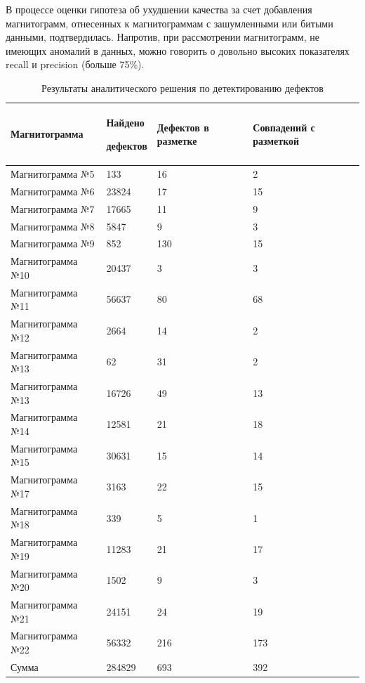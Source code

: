 \documentclass[a4paper,article,14pt]{extarticle}
\begin{document}
В процессе оценки гипотеза об ухудшении качества за счет добавления магнитограмм, отнесенных к магнитограммам 
с зашумленными или \flqq битыми\frqq\, данными, подтвердилась. Напротив, при рассмотрении магнитограмм, не имеющих аномалий 
в данных, можно говорить о довольно высоких показателях recall и precision (больше 75\%).

\begin{center}
    \begin{longtable}{|p{5cm}|p{3cm}|p{3cm}|p{3cm}|}
        \caption{Результаты аналитического решения по детектированию дефектов}\\\hline
        Магнитограмма & Найдено \par дефектов & Дефектов в разметке & Совпадений с разметкой \\ \hline
        Магнитограмма №5	& 133	& 16	& 2 \\ \hline
        Магнитограмма №6	& 23824	& 17	& 15 \\ \hline
        Магнитограмма №7	& 17665	& 11	& 9 \\ \hline
        Магнитограмма №8	& 5847	& 9	    & 3 \\ \hline
        Магнитограмма №9	& 852	& 130	& 15 \\ \hline
        Магнитограмма №10	& 20437	& 3	    & 3 \\ \hline
        Магнитограмма №11	& 56637	& 80	& 68 \\ \hline
        Магнитограмма №12	& 2664	& 14	& 2 \\ \hline
        Магнитограмма №13	& 62	& 31	& 2 \\ \hline
        Магнитограмма №13	& 16726	& 49	& 13 \\ \hline
        Магнитограмма №14	& 12581	& 21	& 18 \\ \hline
        Магнитограмма №15	& 30631	& 15	& 14 \\ \hline
        Магнитограмма №17	& 3163	& 22	& 15 \\ \hline
        Магнитограмма №18	& 339	& 5	    & 1 \\ \hline
        Магнитограмма №19	& 11283	& 21	& 17 \\ \hline
        Магнитограмма №20	& 1502	& 9	    & 3 \\ \hline
        Магнитограмма №21	& 24151	& 24	& 19 \\ \hline
        Магнитограмма №22	& 56332	& 216	& 173 \\ \hline
        Сумма	& 284829	& 693	& 392 \\ \hline
    \end{longtable}
\end{center}
\end{document}
